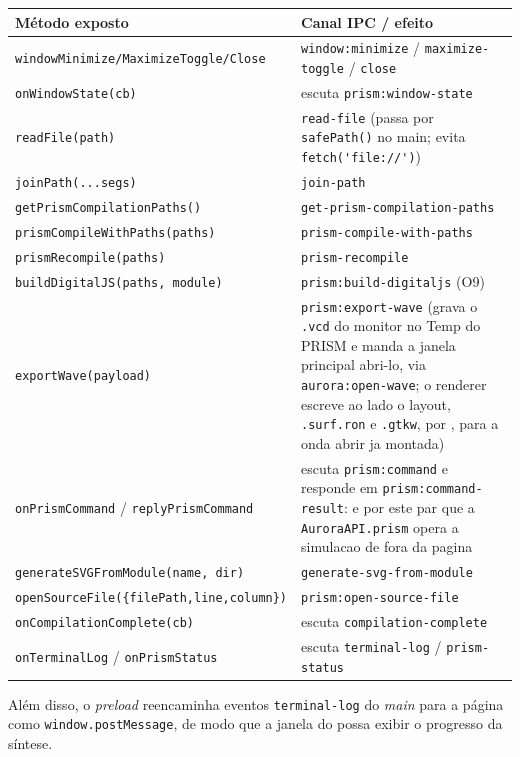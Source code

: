 \begin{tabularx}{\linewidth}{Y Z}
\toprule
\textbf{Método exposto} & \textbf{Canal IPC / efeito} \\
\midrule
\lstinline|windowMinimize/MaximizeToggle/Close| & \lstinline|window:minimize| / \lstinline|maximize-toggle| / \lstinline|close| \\
\lstinline|onWindowState(cb)| & escuta \lstinline|prism:window-state| \\
\lstinline|readFile(path)| & \lstinline|read-file| (passa por \lstinline|safePath()| no main; evita \lstinline|fetch('file://')|) \\
\lstinline|joinPath(...segs)| & \lstinline|join-path| \\
\lstinline|getPrismCompilationPaths()| & \lstinline|get-prism-compilation-paths| \\
\lstinline|prismCompileWithPaths(paths)| & \lstinline|prism-compile-with-paths| \\
\lstinline|prismRecompile(paths)| & \lstinline|prism-recompile| \\
\lstinline|buildDigitalJS(paths, module)| & \lstinline|prism:build-digitaljs| (O9) \\
\lstinline|exportWave(payload)| & \lstinline|prism:export-wave| (grava o \lstinline|.vcd| do monitor no Temp do PRISM e manda a janela principal abri-lo, via \lstinline|aurora:open-wave|; o renderer escreve ao lado o layout, \lstinline|.surf.ron| e \lstinline|.gtkw|, por , para a onda abrir ja montada) \\
\lstinline|onPrismCommand| / \lstinline|replyPrismCommand| & escuta \lstinline|prism:command| e responde em \lstinline|prism:command-result|: e por este par que a \lstinline|AuroraAPI.prism| opera a simulacao de fora da pagina \\
\lstinline|generateSVGFromModule(name, dir)| & \lstinline|generate-svg-from-module| \\
\lstinline|openSourceFile({filePath,line,column})| & \lstinline|prism:open-source-file| \\
\lstinline|onCompilationComplete(cb)| & escuta \lstinline|compilation-complete| \\
\lstinline|onTerminalLog| / \lstinline|onPrismStatus| & escuta \lstinline|terminal-log| / \lstinline|prism-status| \\
\bottomrule
\end{tabularx}

Além disso, o \emph{preload} reencaminha eventos \lstinline|terminal-log| do
\emph{main} para a página como \lstinline|window.postMessage|, de modo que a
janela do  possa exibir o progresso da síntese.

